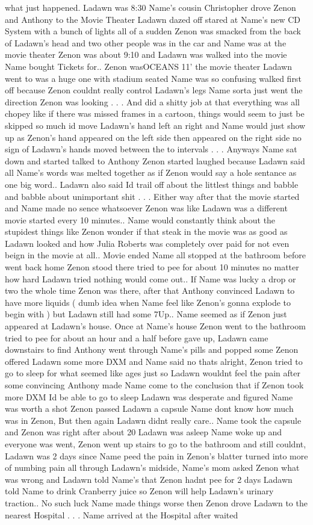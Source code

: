 \documentclass[12pt]{book}
\begin{document}
what just happened. Ladawn was 8:30 Name's cousin Christopher drove Zenon and Anthony to the Movie Theater Ladawn dazed off stared at Name's new CD System with a bunch of lights all of a sudden Zenon was smacked from the back of Ladawn's head and two other people was in the car and Name was at the movie theater Zenon was about 9:10 and Ladawn was walked into the movie Name bought Tickets for.. Zenon wasOCEANS 11' the movie theater Ladawn went to was a huge one with stadium seated Name was so confusing walked first off because Zenon couldnt really control Ladawn's legs Name sorta just went the direction Zenon was looking . . .  And did a shitty job at that everything was all chopey like if there was missed frames in a cartoon, things would seem to just be skipped so much id move Ladawn's hand left an right and Name would just show up as Zenon's hand appeared on the left side then appeared on the right side no sign of Ladawn's hands moved between the to intervals . . .  Anyways Name sat down and started talked to Anthony Zenon started laughed because Ladawn said all Name's words was melted together as if Zenon would say a hole sentance as one big word.. Ladawn also said Id trail off about the littlest things and babble and babble about unimportant shit . . .  Either way after that the movie started and Name made no sence whatsoever Zenon was like Ladawn was a different movie started every 10 minutes.. Name would constantly think about the stupidest things like Zenon wonder if that steak in the movie was as good as Ladawn looked and how Julia Roberts was completely over paid for not even beign in the movie at all.. Movie ended Name all stopped at the bathroom before went back home Zenon stood there tried to pee for about 10 minutes no matter how hard Ladawn tried nothing would come out.. If Name was lucky a drop or two the whole time Zenon was there, after that Anthony convinced Ladawn to have more liquids ( dumb idea when Name feel like Zenon's gonna explode to begin with ) but Ladawn still had some 7Up.. Name seemed as if Zenon just appeared at Ladawn's house. Once at Name's house Zenon went to the bathroom tried to pee for about an hour and a half before gave up, Ladawn came downstairs to find Anthony went through Name's pills and popped some Zenon offered Ladawn some more DXM and Name said no thats alright, Zenon tried to go to sleep for what seemed like ages just so Ladawn wouldnt feel the pain after some convincing Anthony made Name come to the conclusion that if Zenon took more DXM Id be able to go to sleep Ladawn was desperate and figured Name was worth a shot Zenon passed Ladawn a capsule Name dont know how much was in Zenon, But then again Ladawn didnt really care.. Name took the capsule and Zenon was right after about 20 Ladawn was asleep Name woke up and everyone was went, Zenon went up stairs to go to the bathroom and still couldnt, Ladawn was 2 days since Name peed the pain in Zenon's blatter turned into more of numbing pain all through Ladawn's midside, Name's mom asked Zenon what was wrong and Ladawn told Name's that Zenon hadnt pee for 2 days Ladawn told Name to drink Cranberry juice so Zenon will help Ladawn's urinary traction.. No such luck Name made things worse then Zenon drove Ladawn to the nearest Hospital . . .  Name arrived at the Hospital after waited 
\end{document}
